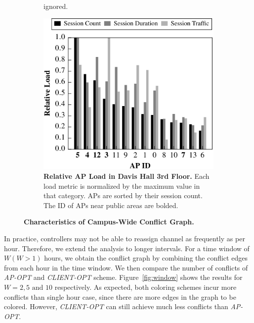 \begin{figure}[t]
\begin{subfigure}[t]{0.3\textwidth}
{    ignored.}
    \label{fig:campus_node_degree}
  \end{subfigure}%
  \begin{subfigure}[t]{0.3\textwidth}
    \includegraphics[width=\columnwidth]{./figures/DavisAPLoad.pdf}
    \caption{\textbf{Relative AP Load in Davis Hall 3rd Floor.} Each load metric
      is normalized by the maximum value in that category. APs are sorted by their session count.
    The ID of APs near public areas are bolded.}
    \label{fig:load}
  \end{subfigure}

  \caption{\textbf{Characteristics of Campus-Wide Conflict Graph.}}
  \vspace*{\aftercaptiongap}
\end{figure}

In practice, controllers may not be able to reassign channel as frequently as
per hour. Therefore, we extend the analysis to longer intervals. For a time
window of $W (W>1)$ hours, we obtain the conflict graph by combining the
conflict edges from each hour in the time window. We then compare the number of
conflicts of \textit{AP-OPT} and \textit{CLIENT-OPT} scheme.
Figure~\ref{fig:window} shows the results for $W=2, 5 \text{ and } 10$
respectively. As expected, both coloring schemes incur more conflicts than
single hour case, since there are more edges in the graph to be colored.
However, \textit{CLIENT-OPT} can still achieve much less conflicts than
\textit{AP-OPT}.

